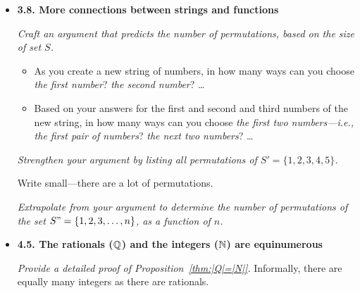 


\begin{itemize}
\item
{\bf 3.8. More connections between strings and functions}
\medskip

{\em Craft an argument that predicts the number of permutations, based on the size of set $S$.}
\smallskip

\begin{itemize}
\item
As you create a new string of numbers, in how many ways can you choose {\em the first number}? 
{\em the second number}? \ldots
\item
Based on your answers for the first and second and third numbers of the new string, 
in how many ways can you choose {\em the first two numbers---i.e., the first {\em pair} of numbers}? 
{\em the next two numbers}? \ldots
\end{itemize}

{\em Strengthen your argument by listing all permutations of  $S' =  \{1,2,3,4,5\}$.}

\smallskip

Write small---there are a lot of permutations.

{\em Extrapolate from your argument to determine the number of permutations of the set 
$S" =  \{1,2,3, \ldots, n\}$, as a function of $n$.}

\end{itemize}



\begin{itemize}
\item
{\bf 4.5. The rationals ($\mathbb{Q}$) and the integers ($\mathbb{N}$) are equinumerous}
\smallskip

{\em Provide a {\em detailed} proof of Proposition~\ref{thm:|Q|=|N|}.}  
Informally, there are equally many integers as there are rationals.
\end{itemize}


